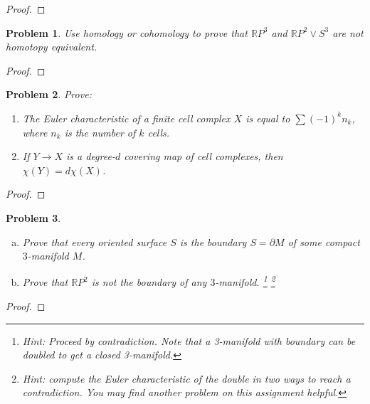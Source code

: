 \documentclass[11pt]{article}
\newtheorem{problem}{Problem}
\begin{document}
\begin{proof}

\end{proof}

\pagebreak 

\begin{problem}
Use homology or cohomology to prove that $\mathbb RP^3$ and $\mathbb RP^2\vee S^3$ are not homotopy equivalent.  
\end{problem}

\begin{proof}

\end{proof}

\pagebreak 

\begin{problem}
Prove:
\begin{enumerate}
\item[(a)] The Euler characteristic of a finite cell complex $X$ is equal to $\sum (-1)^kn_k$, where $n_k$ is the number of $k$ cells.
\item[(b)] If $Y\to X$ is a degree-$d$ covering map of cell complexes, then $\chi(Y)=d\chi(X)$. 
\end{enumerate} 
\end{problem}

\begin{proof}

\end{proof}

\pagebreak 

\begin{problem}
\begin{enumerate}[(a)]
\item Prove that every oriented surface $S$ is the boundary $S=\partial M$ of some compact $3$-manifold $M$.
\item Prove that $\mathbb R P^2$ is not the boundary of any $3$-manifold. \footnote{Hint: Proceed by contradiction. Note that a 3-manifold with boundary can be doubled to get a closed 3-manifold.} \footnote{Hint: compute the Euler characteristic of the double in two ways to reach a contradiction. You may find another problem on this assignment helpful.}
\end{enumerate} 
\end{problem}

\begin{proof}

\end{proof}
\end{document}

